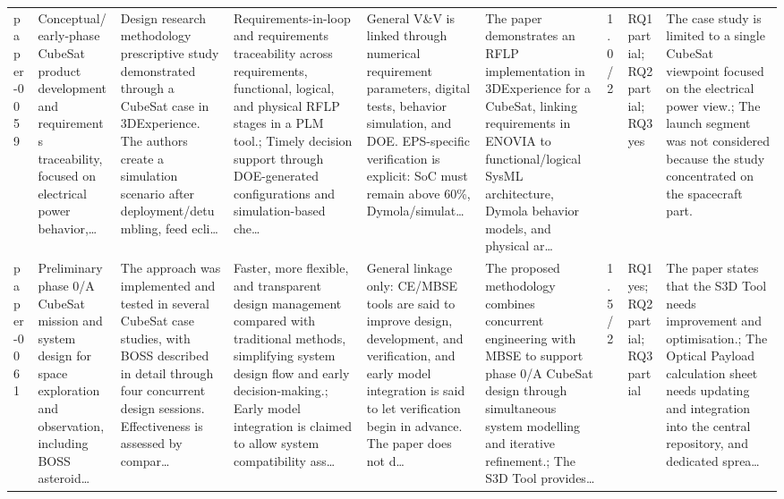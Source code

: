 \documentclass[10pt]{article}
\begin{document}
\begin{landscape}
\begin{longtable}{p{1.0cm}p{2.4cm}p{3.1cm}p{3.7cm}p{3.4cm}p{3.1cm}p{1.0cm}p{1.8cm}p{3.4cm}}
paper-0059 & Conceptual/early-phase CubeSat product development and requirements traceability, focused on electrical power behavior,… & Design research methodology prescriptive study demonstrated through a CubeSat case in 3DExperience. The authors create a simulation scenario after deployment/detumbling, feed ecli… & Requirements-in-loop and requirements traceability across requirements, functional, logical, and physical RFLP stages in a PLM tool.; Timely decision support through DOE-generated configurations and simulation-based che… & General V\&V is linked through numerical requirement parameters, digital tests, behavior simulation, and DOE. EPS-specific verification is explicit: SoC must remain above 60\%, Dymola/simulat… & The paper demonstrates an RFLP implementation in 3DExperience for a CubeSat, linking requirements in ENOVIA to functional/logical SysML architecture, Dymola behavior models, and physical ar… & 1.0/2 & RQ1 partial; RQ2 partial; RQ3 yes & The case study is limited to a single CubeSat viewpoint focused on the electrical power view.; The launch segment was not considered because the study concentrated on the spacecraft part. \\
paper-0061 & Preliminary phase 0/A CubeSat mission and system design for space exploration and observation, including BOSS asteroid… & The approach was implemented and tested in several CubeSat case studies, with BOSS described in detail through four concurrent design sessions. Effectiveness is assessed by compar… & Faster, more flexible, and transparent design management compared with traditional methods, simplifying system design flow and early decision-making.; Early model integration is claimed to allow system compatibility ass… & General linkage only: CE/MBSE tools are said to improve design, development, and verification, and early model integration is said to let verification begin in advance. The paper does not d… & The proposed methodology combines concurrent engineering with MBSE to support phase 0/A CubeSat design through simultaneous system modelling and iterative refinement.; The S3D Tool provides… & 1.5/2 & RQ1 yes; RQ2 partial; RQ3 partial & The paper states that the S3D Tool needs improvement and optimisation.; The Optical Payload calculation sheet needs updating and integration into the central repository, and dedicated sprea… \\

\end{longtable}
\end{landscape}
\end{document}
